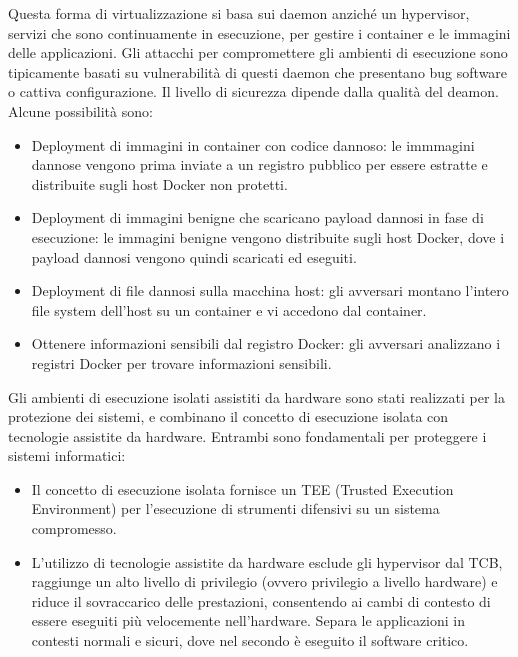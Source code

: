 Questa forma di virtualizzazione si basa sui daemon anziché un hypervisor, servizi che sono continuamente in esecuzione, per gestire i container e le immagini delle applicazioni. Gli attacchi per compromettere gli ambienti di esecuzione sono tipicamente basati su vulnerabilità di questi daemon che presentano bug software o cattiva configurazione. Il livello di sicurezza dipende dalla qualità del deamon. Alcune possibilità sono:
\begin{itemize}
    \item Deployment di immagini in container con codice dannoso: le immmagini dannose vengono prima inviate a un registro pubblico per essere estratte e distribuite sugli host Docker non protetti.
    \item Deployment di immagini benigne che scaricano payload dannosi in fase di esecuzione: le immagini benigne vengono distribuite sugli host Docker, dove i payload dannosi vengono quindi scaricati ed eseguiti.
    \item Deployment di file dannosi sulla macchina host: gli avversari montano l'intero file system dell'host su un container e vi accedono dal container. 
    \item Ottenere informazioni sensibili dal registro Docker: gli avversari analizzano i registri Docker per trovare informazioni sensibili.
\end{itemize}
Gli ambienti di esecuzione isolati assistiti da hardware sono stati
realizzati per la protezione dei sistemi, e combinano il concetto
di esecuzione isolata con tecnologie assistite da hardware.
Entrambi sono fondamentali per proteggere i sistemi informatici:
\begin{itemize}
    \item Il concetto di esecuzione isolata fornisce un TEE (Trusted
    Execution Environment) per l'esecuzione di strumenti
    difensivi su un sistema compromesso.
    \item L'utilizzo di tecnologie assistite da hardware esclude gli
    hypervisor dal TCB, raggiunge un alto livello di privilegio
    (ovvero privilegio a livello hardware) e riduce il sovraccarico
    delle prestazioni, consentendo ai cambi di contesto di essere
    eseguiti più velocemente nell'hardware.
    Separa le applicazioni in
    contesti normali e sicuri,
    dove nel secondo è eseguito
    il software critico.
\end{itemize}

